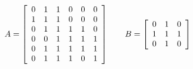 \documentclass[varwidth=true]{standalone}
\newcommand{\tikzmark}[2]{\tikz[overlay,remember picture,baseline=(#1.base)] \node (#1) {#2};}
\begin{document}
\[
	A = \left[\begin{array}{*6{c}}
    0 & 1 & 1 & 0 & 0 & 0 \\
    1 & 1 & 1 & 0 & 0 & 0 \\
    0 & 1 & 1 & 1 & 1 & 0 \\
    0 & 0 & 1 & 1 & 1 & 1 \\
    0 & 1 & 1 & 1 & 1 & 1  \\
    0 & 1 & 1 & 1 & 0 & 1 
  \end{array}\right]
  \qquad
  B  = \left[\begin{array}{*3{c}}
    \tikzmark{left}{0} & 1 & 0\\
    1 & 1 & 1 \\
    0 & 1 & \tikzmark{right}{0}
  \end{array}\right]
\]




\end{document}
